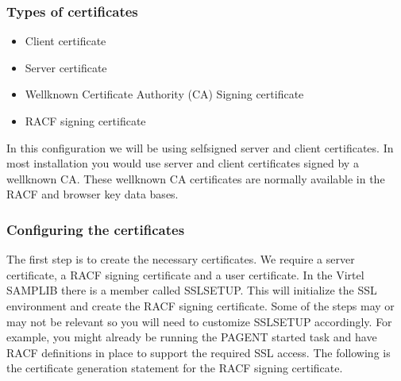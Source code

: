 \documentclass[letterpaper,10pt,english]{sphinxmanual}
\begin{document}
\subsubsection{Types of certificates}
\label{\detokenize{Customization:types-of-certificates}}\begin{itemize}
\item {} 
\sphinxAtStartPar
Client certificate

\item {} 
\sphinxAtStartPar
Server certificate

\item {} 
\sphinxAtStartPar
Well\sphinxhyphen{}known Certificate Authority (CA) Signing certificate

\item {} 
\sphinxAtStartPar
RACF signing certificate

\end{itemize}

\sphinxAtStartPar
In this configuration we will be using self\sphinxhyphen{}signed server and client certificates. In most installation you would use server and client certificates signed by a well\sphinxhyphen{}known CA. These well\sphinxhyphen{}known CA certificates are normally available in the RACF and browser key data bases.

\ignorespaces 

\subsubsection{Configuring the certificates}
\label{\detokenize{Customization:configuring-the-certificates}}\label{\detokenize{Customization:index-107}}
\sphinxAtStartPar
The first step is to create the necessary certificates. We require a server certificate, a RACF signing certificate and a user certificate. In the Virtel SAMPLIB there is a member called SSLSETUP. This will initialize the SSL environment and create the RACF signing certificate. Some of the steps may or may not be relevant so you will need to customize SSLSETUP accordingly. For example, you might already be running the PAGENT started task and have RACF definitions in place to support the required SSL access. The following is the certificate generation statement for the RACF signing certificate.
\end{document}

